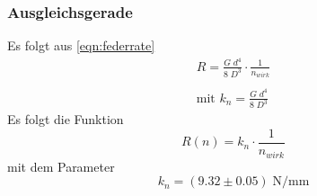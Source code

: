 \subsubsection{Ausgleichsgerade}

Es folgt aus \ref{eqn:federrate}
\begin{align*}
  R=\frac{G\;d^4}{8\;D^3}\cdot \frac{1}{n_{wirk}} \\\\  
  \text{mit } k_n=\frac{G\;d^4}{8\;D^3}
\end{align*}
Es folgt die Funktion
\begin{equation*}
  R(n)=k_n \cdot \frac{1}{n_{wirk}}
\end{equation*}
mit dem Parameter
\begin{equation*}
  k_n=(9.32 \pm 0.05) \;\si{\N\per\mm}
\end{equation*}


